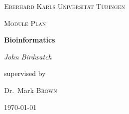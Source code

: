 \begin{titlepage}
\centering

{\scshape\LARGE Eberhard Karls Universität Tübingen \par}
\vspace{1cm}
{\scshape\Large Module Plan \par}
\vspace{1.5cm}
{\huge\bfseries Bioinformatics \par}
\vspace{2cm}
{\Large\itshape John Birdwatch\par}
\vfill
supervised by\par
Dr.~Mark \textsc{Brown}

\vfill

{\large \today\par}
\end{titlepage}